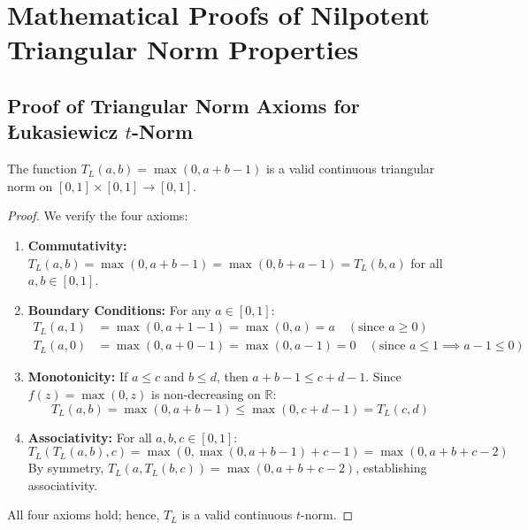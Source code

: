 \label{chap:appendix}

\section{Mathematical Proofs of Nilpotent Triangular Norm Properties}

\subsection{Proof of Triangular Norm Axioms for \L{}ukasiewicz \texorpdfstring{$t$}{t}-Norm}
\begin{Theorem}
The function $T_L(a, b) = \max(0, a + b - 1)$ is a valid continuous triangular norm on $[0, 1] \times [0, 1] \to [0, 1]$.
\end{Theorem}
\begin{proof}
We verify the four axioms:
\begin{enumerate}
    \item \textbf{Commutativity:} $T_L(a, b) = \max(0, a + b - 1) = \max(0, b + a - 1) = T_L(b, a)$ for all $a, b \in [0, 1]$.
    \item \textbf{Boundary Conditions:} For any $a \in [0, 1]$:
    \begin{align}
    T_L(a, 1) &= \max(0, a + 1 - 1) = \max(0, a) = a \quad (\text{since } a \ge 0) \\
    T_L(a, 0) &= \max(0, a + 0 - 1) = \max(0, a - 1) = 0 \quad (\text{since } a \le 1 \implies a - 1 \le 0)
    \end{align}
    \item \textbf{Monotonicity:} If $a \le c$ and $b \le d$, then $a + b - 1 \le c + d - 1$. Since $f(z) = \max(0, z)$ is non-decreasing on $\mathbb{R}$:
    \begin{equation}
    T_L(a, b) = \max(0, a + b - 1) \le \max(0, c + d - 1) = T_L(c, d)
    \end{equation}
    \item \textbf{Associativity:} For all $a, b, c \in [0, 1]$:
    \begin{equation}
    T_L(T_L(a, b), c) = \max\left(0, \max(0, a + b - 1) + c - 1\right) = \max(0, a + b + c - 2)
    \end{equation}
    By symmetry, $T_L(a, T_L(b, c)) = \max(0, a + b + c - 2)$, establishing associativity.
\end{enumerate}
All four axioms hold; hence, $T_L$ is a valid continuous $t$-norm.
\end{proof}

